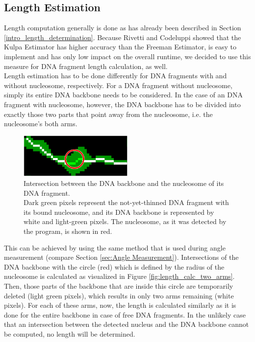 \documentclass{article}
\begin{document}
\subsection{Length Estimation}\label{sec:Length Estimation}
Length computation generally is done as has already been described in Section \ref{intro_length_determination}. Because Rivetti and Codeluppi \cite{rivetti2001accurate} showed that the Kulpa Estimator has higher accuracy than the Freeman Estimator, is easy to implement and has only low impact on the overall runtime, we decided to use this measure for DNA fragment length calculation, as well.\\
Length estimation has to be done differently for DNA fragments with and without nucleosome, respectively. For a DNA fragment without nucleosome, simply its entire DNA backbone needs to be considered. In the case of an DNA fragment with nucleosome, however, the DNA backbone has to be divided into exactly those two parts that point away from the nucleosome, i.e. the nucleosome's both arms. 
\begin{figure}[htb!]
	\centering
	\includegraphics[width = 0.5\textwidth]{length_calc_two_arms.png}
	\caption{Intersection between the DNA backbone and the nucleosome of its DNA fragment.\\
		Dark green pixels represent the not-yet-thinned DNA fragment with its bound nucleosome, and its DNA backbone is represented by white and light-green pixels. The nucleosome, as it was detected by the program, is shown in red.}
	\label{fig: length_calc_two_arms}
\end{figure}
This can be achieved by using the same method that is used during angle measurement (compare Section \ref{sec:Angle Measurement}). Intersections of the DNA backbone with the circle (red) which is defined by the radius of the nucleosome is calculated as visualized in Figure \ref{fig:length_calc_two_arms}. Then, those parts of the backbone that are inside this circle are temporarily deleted (light green pixels), which results in only two arms remaining (white pixels). For each of these arms, now, the length is calculated similarly as it is done for the entire backbone in case of free DNA fragments. In the unlikely case that an intersection between the detected nucleus and the DNA backbone cannot be computed, no length will be determined.
\end{document}
